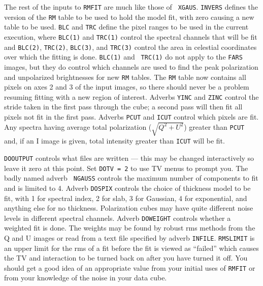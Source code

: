 \documentclass[twoside]{article}
\newcommand{\Me}[1]{\textcolor{mecol}{#1}}
\begin{document}
The rest of the inputs to {\tt RMFIT} are much like those of {\tt
  XGAUS}\@.  {\tt INVERS} defines the version of the {\tt RM} table to
be used to hold the model fit, with zero causing a new table to be
used.  {\tt BLC} and {\tt TRC} define the pixel ranges to be used in
the current execution, where {\tt BLC(1)} and {\tt TRC(1)} control the
spectral channels that will be fit and {\tt BLC(2)}, {\tt TRC(2)},
{\tt BLC(3)}, and {\tt TRC(3)} control the area in celestial
coordinates over which the fitting is done.  {\tt BLC(1)} and {\tt
TRC(1)} do not apply to the {\tt FARS} images\Me{, but they do control
which channels are used to find the peak polarization and unpolarized
brightnesses for new {\tt RM} tables.  The {\tt RM} table now contains
all pixels on axes 2 and 3 of the input images, so there should never
be a problem resuming fitting with a new region of interest.}  Adverbs
{\tt YINC} and {\tt ZINC} control the stride taken in the first pass
through the cube; a second pass will then fit all pixels not fit in
the first pass.  Adverbs {\tt PCUT} and {\tt ICUT} control which
pixels are fit.  Any spectra having average total polarization
($\sqrt{Q^2 + U^2}$) greater than {\tt PCUT} and, if an I image is
given, total intensity greater than {\tt ICUT} will be fit.

{\tt DOOUTPUT} controls what files are written --- this may be
changed interactively so leave it zero at this point.  Set {\tt DOTV
= 2} to use TV menus to prompt you.  The badly named adverb {\tt
NGAUSS} controls the maximum number of components to fit and is
limited to 4.  Adverb {\tt DOSPIX} controls the choice of thickness
model to  be fit, with 1 for spectral index, 2 for slab, 3 for
Gaussian, 4 for  exponential, and anything else for no thickness.
Polarization cubes may have quite different noise levels in
different spectral channels.   Adverb {\tt DOWEIGHT} controls whether
a weighted fit is done.  The weights may be found by robust rms
methods from the Q and U images or read from a text file specified by
adverb {\tt INFILE}\@.  {\tt RMSLIMIT} is an upper limit for the rms
of a fit before the fit is viewed as ``failed'' which causes the TV
and interaction to be turned back on after you have turned it off.
You should get a good idea of an appropriate value from your initial
uses of {\tt RMFIT} or from your knowledge of the noise in your data
cube.
\end{document}
